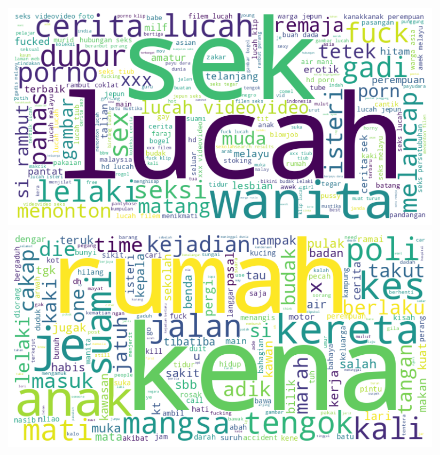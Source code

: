 \documentclass[preprint]{article}
\begin{document}
\begin{figure}[h]
\centering
\begin{minipage}[b]{0.45\textwidth}
\centering
\includegraphics[width=\linewidth]{img/porn-wordcloud.png}
\end{minipage}
\hfill
\begin{minipage}[b]{0.45\textwidth}
\centering
\includegraphics[width=\linewidth]{img/violence-wordcloud.png}
\end{minipage}
\end{figure}
\end{document}
